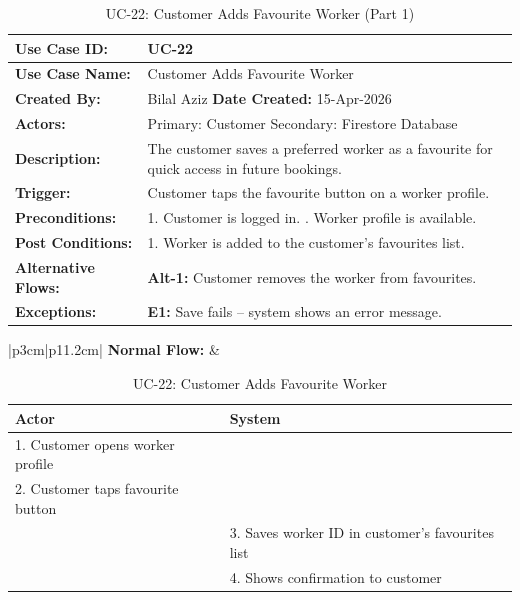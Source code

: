 {\small
\renewcommand{\arraystretch}{1.05}
\begin{table}[H]
\centering
\begin{tabular}{|p{3cm}|p{11.2cm}|}
\hline
\textbf{Use Case ID:} & UC-22 \\ \hline
\textbf{Use Case Name:} & Customer Adds Favourite Worker \\ \hline
\textbf{Created By:} & Bilal Aziz \hfill \textbf{Date Created:} 15-Apr-2026 \\ \hline
\textbf{Actors:} & Primary: Customer \quad Secondary: Firestore Database \\ \hline
\textbf{Description:} & The customer saves a preferred worker as a favourite for quick access in future bookings. \\ \hline
\textbf{Trigger:} & Customer taps the favourite button on a worker profile. \\ \hline
\textbf{Preconditions:} & 1. Customer is logged in. \newline 2. Worker profile is available. \\ \hline
\textbf{Post Conditions:} & 1. Worker is added to the customer's favourites list. \\ \hline
\textbf{Alternative Flows:} & \textbf{Alt-1:} Customer removes the worker from favourites. \\ \hline
\textbf{Exceptions:} & \textbf{E1:} Save fails -- system shows an error message. \\ \hline
\end{tabular}
\caption*{UC-22: Customer Adds Favourite Worker (Part 1)}
\end{table}
}

\newpage

{\small
\renewcommand{\arraystretch}{1.05}
\begin{table}[H]
\centering
\begin{tabular}{|p{3cm}|p{11.2cm}|}
\hline
\textbf{Normal Flow:} &
\begin{tabular}[t]{|p{5.4cm}|p{5.4cm}|}
\hline
\textbf{Actor} & \textbf{System} \\ \hline
1. Customer opens worker profile & \\ \hline
2. Customer taps favourite button & \\ \hline
 & 3. Saves worker ID in customer's favourites list \\ \hline
 & 4. Shows confirmation to customer \\ \hline
\end{tabular} \\ \hline
\end{tabular}
\caption{UC-22: Customer Adds Favourite Worker}
\end{table}
}

